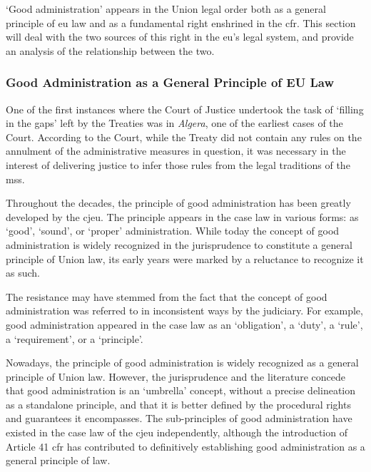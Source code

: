 `Good administration' appears in the Union legal order both as a general principle of \gls{eu} law and as a fundamental right enshrined in the \gls{cfr}. 
This section will deal with the two sources of this right in the \gls{eu}'s legal system, and provide an analysis of the relationship between the two.

\subsubsection{Good Administration as a General Principle of EU Law}
\label{sec:ch2-general-principle}

One of the first instances where the Court of Justice undertook the task of `filling in the gaps' left by the Treaties was in \emph{Algera}, one of the earliest cases of the Court.
According to the Court, while the Treaty did not contain any rules on the annulment of the administrative measures in question, it was necessary in the interest of delivering justice to infer those rules from the legal traditions of the \glspl{ms}.\autocite[para A III]{algera}

Throughout the decades, the principle of good administration has been greatly developed by the \gls{cjeu}.
The principle appears in the case law in various forms: as `good',\autocite[para 1A]{alvis} `sound',\autocite[para A II]{societesarre} or `proper'\autocite[paras 7 and 12]{burban} administration. 
While today the concept of good administration is widely recognized in the jurisprudence to constitute a general principle of Union law, its early years were marked by a reluctance to recognize it as such.\autocite[66--68]{mihaescu-evansRightGoodAdministration2015} 

The resistance may have stemmed from the fact that the concept of good administration was referred to in inconsistent ways by the judiciary. 
For example, good administration appeared in the case law as an `obligation',\autocite[paras 245 and 279]{volkswagenAg} a `duty',\autocite[126]{bundesverbandDeutscherBanken} a `rule',\autocite[4]{vanEick} a `requirement',\autocite[71]{vba} or a `principle'.\autocite[24--31]{tetraPak} 

Nowadays, the principle of good administration is widely recognized as a general principle of Union law.\autocite[210]{hotelCipriani} 
However, the jurisprudence and the literature concede that good administration is an `umbrella' concept, without a precise delineation as a standalone principle,\autocite[points 60--61]{commVScottAG} and that it is better defined by the procedural rights and guarantees it encompasses.\autocite[73--74]{mihaescu-evansRightGoodAdministration2015}
The sub-principles of good administration have existed in the case law of the \gls{cjeu} independently, although the introduction of Article 41 \gls{cfr} has contributed to definitively establishing good administration as a general principle of law.

